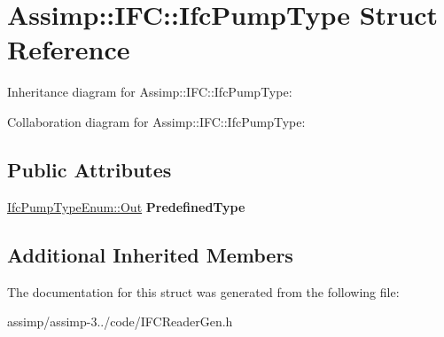 \hypertarget{struct_assimp_1_1_i_f_c_1_1_ifc_pump_type}{\section{Assimp\+:\+:I\+F\+C\+:\+:Ifc\+Pump\+Type Struct Reference}
\label{struct_assimp_1_1_i_f_c_1_1_ifc_pump_type}
}


Inheritance diagram for Assimp\+:\+:I\+F\+C\+:\+:Ifc\+Pump\+Type\+:


Collaboration diagram for Assimp\+:\+:I\+F\+C\+:\+:Ifc\+Pump\+Type\+:
\subsection*{Public Attributes}
\begin{DoxyCompactItemize}
\item 
\hypertarget{struct_assimp_1_1_i_f_c_1_1_ifc_pump_type_afefb3b8cafe25a451b3affc7e4ba123d}{\hyperlink{classboost_1_1shared__ptr}{Ifc\+Pump\+Type\+Enum\+::\+Out} {\bfseries Predefined\+Type}}\label{struct_assimp_1_1_i_f_c_1_1_ifc_pump_type_afefb3b8cafe25a451b3affc7e4ba123d}

\end{DoxyCompactItemize}
\subsection*{Additional Inherited Members}


The documentation for this struct was generated from the following file\+:\begin{DoxyCompactItemize}
\item 
assimp/assimp-\/3../code/I\+F\+C\+Reader\+Gen.\+h\end{DoxyCompactItemize}

